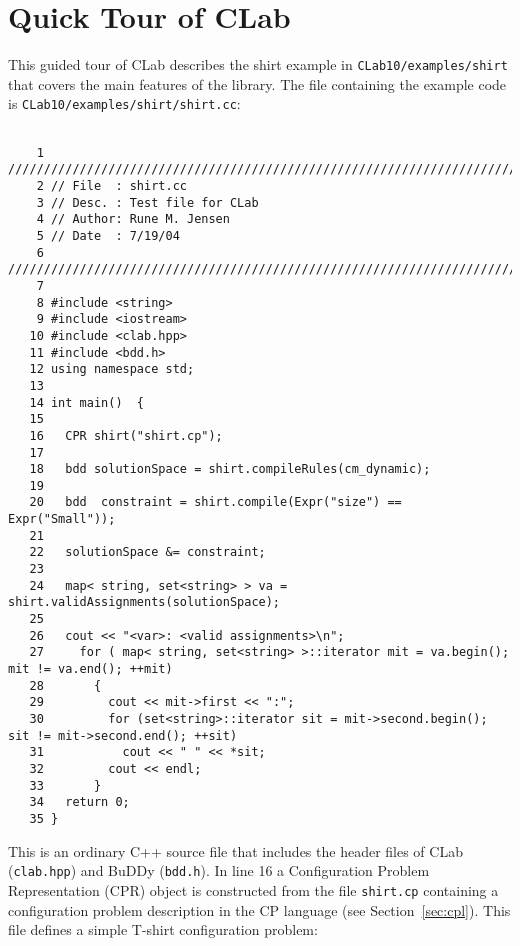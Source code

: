 \documentclass{article}
\begin{document}
\section{Quick Tour of CLab}
\label{sec:tour}

This guided tour of CLab describes the shirt example in
\texttt{CLab10/examples/shirt} that covers the main features of the
library. The file containing the example code is
\texttt{CLab10/examples/shirt/shirt.cc}:

\footnotesize
\begin{verbatim} 

    1 //////////////////////////////////////////////////////////////////////////
    2 // File  : shirt.cc   
    3 // Desc. : Test file for CLab
    4 // Author: Rune M. Jensen 
    5 // Date  : 7/19/04
    6 //////////////////////////////////////////////////////////////////////////
    7
    8 #include <string>
    9 #include <iostream> 
   10 #include <clab.hpp>
   11 #include <bdd.h>
   12 using namespace std;
   13
   14 int main()  {
   15
   16   CPR shirt("shirt.cp");
   17 
   18   bdd solutionSpace = shirt.compileRules(cm_dynamic);
   19
   20   bdd  constraint = shirt.compile(Expr("size") == Expr("Small"));
   21
   22   solutionSpace &= constraint;
   23 
   24   map< string, set<string> > va = shirt.validAssignments(solutionSpace);
   25 
   26   cout << "<var>: <valid assignments>\n";
   27     for ( map< string, set<string> >::iterator mit = va.begin(); mit != va.end(); ++mit)
   28       {
   29         cout << mit->first << ":";
   30         for (set<string>::iterator sit = mit->second.begin(); sit != mit->second.end(); ++sit)
   31  	        cout << " " << *sit;
   32         cout << endl;
   33       }
   34   return 0; 
   35 }

\end{verbatim}
\normalsize
This is an ordinary C++ source file that includes the header files
of CLab (\texttt{clab.hpp}) and BuDDy (\texttt{bdd.h}). In line 16 a
Configuration Problem Representation (CPR) object is constructed from the file
\texttt{shirt.cp} containing a configuration problem description in the 
CP language (see Section~\ref{sec:cpl}). This file defines a simple T-shirt
configuration problem:
\end{document}
